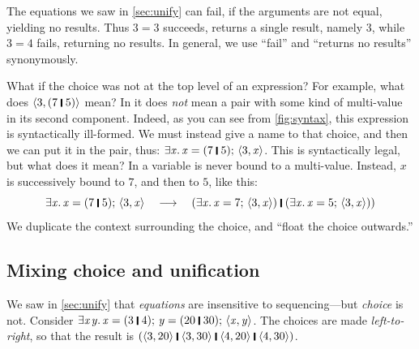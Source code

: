 \documentclass[acmsmall,review,anonymous,dvipsnames]{acmart}
\newcommand{\Varid}[1]{\mathit{#1}}
\begin{document}
The equations we saw in \cref{sec:unify} can fail, if the arguments
are not equal, yielding no results.  Thus \ensuremath{\mathrm{3}\mathrel{=}\mathrm{3}} succeeds, returns a single result, namely \ensuremath{\mathrm{3}},
while \ensuremath{\mathrm{3}\mathrel{=}\mathrm{4}} fails, returning no results.  In general, we use ``fail''
and ``returns no results'' synonymously.

What if the choice was not at the top level of an expression?  For example,
what does \ensuremath{\langle{}\mathrm{3},(\mathrm{7}\;\rule[-0.3mm]{0.5mm}{2.5mm}\;\mathrm{5})\rangle} mean?
In \versecalc{} it does \emph{not} mean a pair with some kind of multi-value in its second component.
Indeed, as you can see from \cref{fig:syntax}, this expression is syntactically ill-formed.
We must instead give a name to that choice, and then we can put it in the pair, thus: \ensuremath{\exists\Varid{x}.\,\Varid{x}\mathrel{=}(\mathrm{7}\;\rule[-0.3mm]{0.5mm}{2.5mm}\;\mathrm{5});\,\langle{}\mathrm{3},\Varid{x}\rangle}.
This is syntactically legal, but what does it mean?  In \versecalc{} a variable is never bound to a multi-value.
Instead, \ensuremath{\Varid{x}} is successively bound to \ensuremath{\mathrm{7}}, and then to \ensuremath{\mathrm{5}}, like this:
$$
\ensuremath{\exists\Varid{x}.\,\Varid{x}\mathrel{=}(\mathrm{7}\;\rule[-0.3mm]{0.5mm}{2.5mm}\;\mathrm{5});\,\langle{}\mathrm{3},\Varid{x}\rangle} \quad \movesto \quad \ensuremath{(\exists\Varid{x}.\,\Varid{x}\mathrel{=}\mathrm{7};\,\langle{}\mathrm{3},\Varid{x}\rangle)\;\rule[-0.3mm]{0.5mm}{2.5mm}\;(\exists\Varid{x}.\,\Varid{x}\mathrel{=}\mathrm{5};\,\langle{}\mathrm{3},\Varid{x}\rangle))}
$$
We duplicate the context surrounding the choice, and ``float the choice outwards.''

\subsection{Mixing choice and unification} \label{sec:mixing}

We saw in \cref{sec:unify} that \emph{equations} are insensitive to sequencing---but \emph{choice} is not.
Consider
\ensuremath{\exists\Varid{x}\hspace{0.3mm}\Varid{y}.\,\Varid{x}\mathrel{=}(\mathrm{3}\;\rule[-0.3mm]{0.5mm}{2.5mm}\;\mathrm{4});\,\Varid{y}\mathrel{=}(\mathrm{20}\;\rule[-0.3mm]{0.5mm}{2.5mm}\;\mathrm{30});\,\langle{}\Varid{x},\Varid{y}\rangle}.  The choices are made \emph{left-to-right}, so that the result is
\ensuremath{(\langle{}\mathrm{3},\mathrm{20}\rangle\;\rule[-0.3mm]{0.5mm}{2.5mm}\;\langle{}\mathrm{3},\mathrm{30}\rangle\;\rule[-0.3mm]{0.5mm}{2.5mm}\;\langle{}\mathrm{4},\mathrm{20}\rangle\;\rule[-0.3mm]{0.5mm}{2.5mm}\;\langle{}\mathrm{4},\mathrm{30}\rangle)}.
\end{document}
